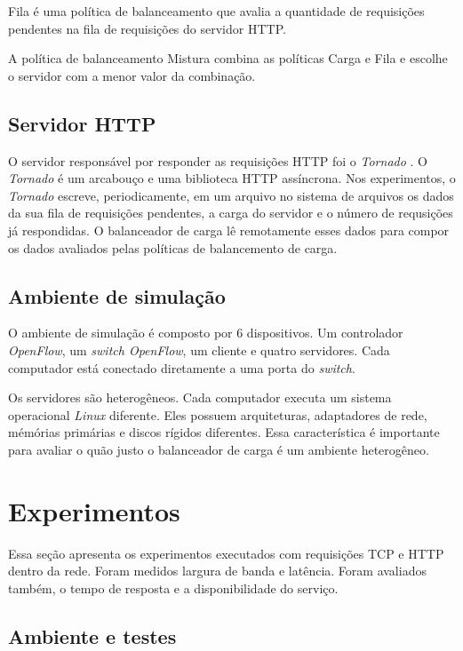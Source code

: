 Fila é uma política de balanceamento que avalia a quantidade de requisições
pendentes na fila de requisições do servidor HTTP.
    
A política de balanceamento Mistura combina as políticas Carga e Fila 
e escolhe o servidor com a menor valor da combinação.

\subsection{Servidor HTTP}

O servidor responsável por responder as requisições HTTP foi o 
\emph{Tornado} \citep{tornado}.
O \emph{Tornado} é um arcabouço e uma biblioteca HTTP assíncrona.
Nos experimentos, o \emph{Tornado} escreve, periodicamente, em um arquivo 
no sistema de arquivos os dados da sua fila de requisições pendentes,
a carga do servidor e o número de requsições já respondidas.
O balanceador de carga lê remotamente esses dados para compor os 
dados avaliados pelas políticas de balancemento de carga.

\subsection{Ambiente de simulação}

O ambiente de simulação é composto por 6 dispositivos.
Um controlador \emph{OpenFlow}, um \emph{switch OpenFlow}, um 
cliente e quatro servidores.
Cada computador está conectado diretamente a uma porta do \emph{switch}.

Os servidores são heterogêneos.
Cada computador executa um sistema operacional \emph{Linux} diferente.
Eles possuem arquiteturas, adaptadores de rede, mémórias primárias
e discos rígidos diferentes.
Essa característica é importante para avaliar o quão justo o balanceador 
de carga é um ambiente heterogêneo.

\section{Experimentos}

Essa seção apresenta os experimentos executados com requisições TCP e HTTP
dentro da rede.
Foram medidos largura de banda e latência.
Foram avaliados também, o tempo de resposta e a disponibilidade do serviço.

\subsection{Ambiente e testes}

